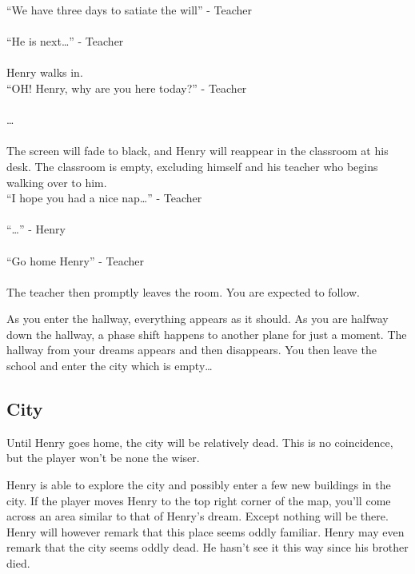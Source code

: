 \documentclass[12pt, a4paper, titlepage]{article}
\begin{document}
           ``We have three days to satiate the will'' - Teacher\\~\\
           ``He is next\ldots'' - Teacher\\~\\
           
           Henry walks in.\\
 
           ``OH! Henry, why are you here today?'' - Teacher\\~\\
           \ldots\\~\\
           
           The screen will fade to black, and Henry will reappear in the classroom at his desk. The classroom is empty, 
           excluding himself and his teacher who begins walking over to him.\\
           
           ``I hope you had a nice nap\ldots'' - Teacher\\~\\
           ``\ldots'' - Henry\\~\\
           ``Go home Henry'' - Teacher\\~\\
           
           The teacher then promptly leaves the room. You are expected to follow.
           
           As you enter the hallway, everything appears as it should. As you are halfway down the hallway, a phase shift happens to another plane for just a moment. The hallway from your 		dreams appears and then disappears. You then leave the school and enter the city which is empty\ldots
           
        \subsection{City}
        
        Until Henry goes home, the city will be relatively dead. This is no coincidence, but the player won't be none the wiser.
        
        Henry is able to explore the city and possibly enter a few new buildings in the city. If the player moves Henry to the top right corner of the map, you'll come across an area similar
        to that of Henry's dream. Except nothing will be there. Henry will however remark that this place seems oddly familiar. Henry may even remark that the city seems oddly dead. He 
        hasn't see it this way since his brother died.
\end{document}
